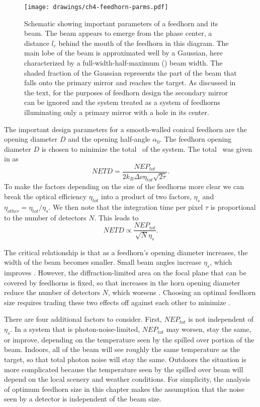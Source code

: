 \begin{figure}
\centering
\texttt{[image: drawings/ch4-feedhorn-parms.pdf]}
\caption[Schematic showing important parameters of a feedhorn and its beam]{
  Schematic showing important parameters of a feedhorn and its beam.
  The beam appears to emerge from the phase center, a distance $l_c$ behind the mouth of the feedhorn in this diagram.
  The main lobe of the beam is approximated well by a Gaussian, here characterized by a full-width-half-maximum (\FWHM) beam width.
  The shaded fraction of the Gaussian represents the part of the beam that falls onto the primary mirror and reaches the target.
  As discussed in the text, for the purposes of feedhorn design the secondary mirror can be ignored and the system treated as a system of feedhorns illuminating only a primary mirror with a hole in its center.}
\label{fig:feedhorn-parms}
\end{figure}

The important design parameters for a smooth-walled conical feedhorn are the opening diameter $D$ and the opening half-angle $\alpha_0$.
The feedhorn opening diameter $D$ is chosen to minimize the total \NETD\ of the system.
The total \NETD\ was given in  as
\begin{equation}
    NETD = \frac{NEP_{tot}}{2 k_B \Delta \nu \eta_{tot} \sqrt{2 \tau}}.
\end{equation}
To make the factors depending on the size of the feedhorns more clear we can break the optical efficiency $\eta_{tot}$ into a product of two factors, $\eta_s$ and $\eta_{other} = \eta_{tot} / \eta_s$.
We then note that the integration time per pixel $\tau$ is proportional to the number of detectors $N$.
This leads to
\begin{equation}
    NETD \propto \frac{NEP_{tot}}{\sqrt{N}\eta_s}.
\end{equation}

The critical relationship is that as a feedhorn's opening diameter increases, the width of the beam becomes smaller.
Small beam angles increase $\eta_s$, which improves \NETD.
However, the diffraction-limited area on the focal plane that can be covered by feedhorns is fixed, so that increases in the horn opening diameter reduce the number of detectors $N$, which worsens \NETD.
Choosing an optimal feedhorn size requires trading these two effects off against each other to minimize \NETD.

There are four additional factors to consider.
First, $NEP_{tot}$ is not independent of $\eta_s$.
In a system that is photon-noise-limited, $NEP_{tot}$ may worsen, stay the same, or improve, depending on the temperature seen by the spilled over portion of the beam.
Indoors, all of the beam will see roughly the same temperature as the target, so that total photon noise will stay the same.
Outdoors the situation is more complicated because the temperature seen by the spilled over beam will depend on the local scenery and weather conditions.
For simplicity, the analysis of optimum feedhorn size in this chapter makes the assumption that the noise seen by a detector is independent of the beam size.

